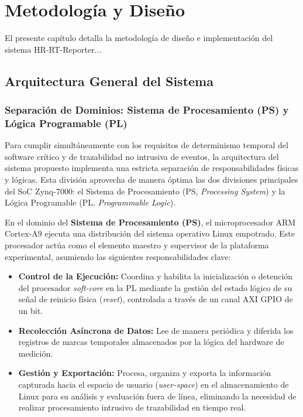 
\chapter{Metodología y Diseño} \label{ch:metodologia}
\graphicspath{{figs/}}

El presente capítulo detalla la metodología de diseño e implementación del sistema HR-RT-Reporter...

\section{Arquitectura General del Sistema}

\subsection{Separación de Dominios: Sistema de Procesamiento (PS) y Lógica Programable (PL)}
\label{ssec:separacion_dominios}

Para cumplir simultáneamente con los requisitos de determinismo temporal del software crítico y de trazabilidad no intrusiva de eventos, la arquitectura del sistema propuesto implementa una estricta separación de responsabilidades físicas y lógicas. Esta división aprovecha de manera óptima las dos divisiones principales del SoC Zynq-7000: el Sistema de Procesamiento (PS, \textit{Processing System}) y la Lógica Programable (PL, \textit{Programmable Logic}).

En el dominio del \textbf{Sistema de Procesamiento (PS)}, el microprocesador ARM Cortex-A9 ejecuta una distribución del sistema operativo Linux empotrado. Este procesador actúa como el elemento maestro y supervisor de la plataforma experimental, asumiendo las siguientes responsabilidades clave:
\begin{itemize}
    \item \textbf{Control de la Ejecución:} Coordina y habilita la inicialización o detención del procesador \textit{soft-core} en la PL mediante la gestión del estado lógico de su señal de reinicio física (\textit{reset}), controlada a través de un canal AXI GPIO de un bit.
    \item \textbf{Recolección Asíncrona de Datos:} Lee de manera periódica y diferida los registros de marcas temporales almacenados por la lógica del hardware de medición.
    \item \textbf{Gestión y Exportación:} Procesa, organiza y exporta la información capturada hacia el espacio de usuario (\textit{user-space}) en el almacenamiento de Linux para su análisis y evaluación fuera de línea, eliminando la necesidad de realizar procesamiento intrusivo de trazabilidad en tiempo real.
\end{itemize}

